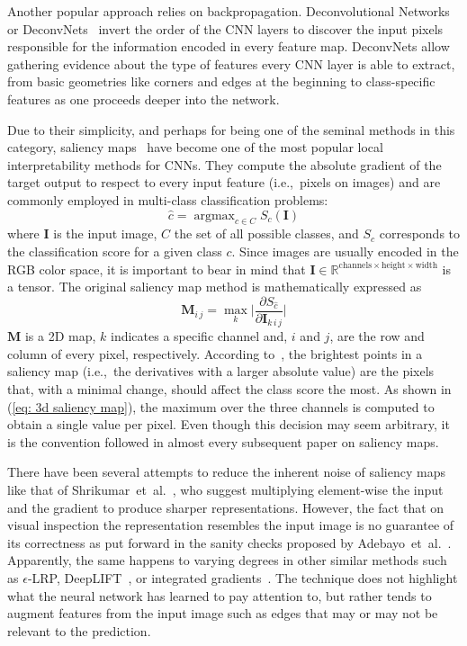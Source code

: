 \documentclass[preprint,12pt]{elsarticle}
\DeclareMathOperator*{\argmax}{argmax}
\begin{document}
Another popular approach relies on backpropagation. Deconvolutional Networks or DeconvNets~\cite{Zeiler2014} invert the order of the CNN layers to discover the input pixels responsible for the information encoded in every feature map. DeconvNets allow gathering evidence about the type of features every CNN layer is able to extract, from basic geometries like corners and edges at the beginning to class-specific features as one proceeds deeper into the network. 

Due to their simplicity, and perhaps for being one of the seminal methods in this category, saliency maps~\cite{Simonyan2014} have become one of the most popular local interpretability methods for CNNs. They compute the absolute gradient of the target output to respect to every input feature (i.e.,~pixels on images) and are commonly employed in multi-class classification problems:
\begin{equation}
    \label{eq: cnn output}
    \hat{c} = \argmax_{c \in C}S_c(\boldsymbol{I})
\end{equation}
where $\boldsymbol{I}$ is the input image, $C$ the set of all possible classes, and $S_c$ corresponds to the classification score for a given class $c$. Since images are usually encoded in the RGB color space, it is important to bear in mind that $\boldsymbol{I} \in \mathbb{R}^{\text{channels} \times \text{height} \times \text{width}}$ is a tensor. The original saliency map method is mathematically expressed as
\begin{equation}
    \boldsymbol{M}_{i\, j} = \max_{k} \bigg | \frac{\partial S_{\hat{c}}}{\partial \boldsymbol{I}_{k\, i\, j}} \bigg |
    \label{eq: 3d saliency map}
\end{equation}
$\boldsymbol{M}$ is a 2D map, $k$ indicates a specific channel and, $i$ and $j$, are the row and column of every pixel, respectively. According to~\cite{Simonyan2014}, the brightest points in a saliency map (i.e.,~the derivatives with a larger absolute value) are the pixels that, with a minimal change, should affect the class score the most. As shown in (\ref{eq: 3d saliency map}), the maximum over the three channels is computed to obtain a single value per pixel. Even though this decision may seem arbitrary, it is the convention followed in almost every subsequent paper on saliency maps.

There have been several attempts to reduce the inherent noise of saliency maps like that of Shrikumar~et~al.~\cite{Shrikumar2017}, who suggest multiplying element-wise the input and the gradient to produce sharper representations. However, the fact that on visual inspection the representation resembles the input image is no guarantee of its correctness as put forward in the sanity checks proposed by Adebayo~et~al.~\citep{Adebayo2018}. Apparently, the same happens to varying degrees in other similar methods such as $\epsilon$-LRP, DeepLIFT~\cite{Ancona2018}, or integrated gradients~\cite{Sundarajan2017}. The technique does not highlight what the neural network has learned to pay attention to, but rather tends to augment features from the input image such as edges that may or may not be relevant to the prediction.
\end{document}
